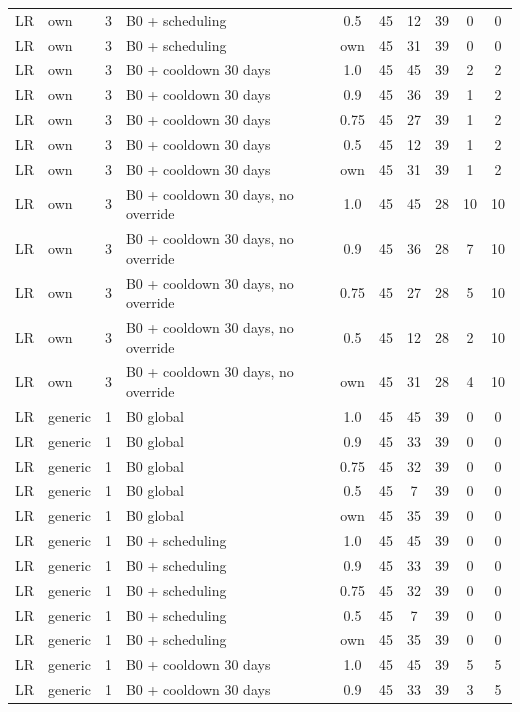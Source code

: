 \documentclass[10pt,onecolumn,letterpaper]{article}
\begin{document}
\begin{longtable}{lllp{4.4cm}cccccc}
LR & own & 3 & B0 + scheduling & 0.5 & 45 & 12 & 39 & 0 & 0 \\
LR & own & 3 & B0 + scheduling & own & 45 & 31 & 39 & 0 & 0 \\
LR & own & 3 & B0 + cooldown 30 days & 1.0 & 45 & 45 & 39 & 2 & 2 \\
LR & own & 3 & B0 + cooldown 30 days & 0.9 & 45 & 36 & 39 & 1 & 2 \\
LR & own & 3 & B0 + cooldown 30 days & 0.75 & 45 & 27 & 39 & 1 & 2 \\
LR & own & 3 & B0 + cooldown 30 days & 0.5 & 45 & 12 & 39 & 1 & 2 \\
LR & own & 3 & B0 + cooldown 30 days & own & 45 & 31 & 39 & 1 & 2 \\
LR & own & 3 & B0 + cooldown 30 days, no override & 1.0 & 45 & 45 & 28 & 10 & 10 \\
LR & own & 3 & B0 + cooldown 30 days, no override & 0.9 & 45 & 36 & 28 & 7 & 10 \\
LR & own & 3 & B0 + cooldown 30 days, no override & 0.75 & 45 & 27 & 28 & 5 & 10 \\
LR & own & 3 & B0 + cooldown 30 days, no override & 0.5 & 45 & 12 & 28 & 2 & 10 \\
LR & own & 3 & B0 + cooldown 30 days, no override & own & 45 & 31 & 28 & 4 & 10 \\
LR & generic & 1 & B0 global & 1.0 & 45 & 45 & 39 & 0 & 0 \\
LR & generic & 1 & B0 global & 0.9 & 45 & 33 & 39 & 0 & 0 \\
LR & generic & 1 & B0 global & 0.75 & 45 & 32 & 39 & 0 & 0 \\
LR & generic & 1 & B0 global & 0.5 & 45 & 7 & 39 & 0 & 0 \\
LR & generic & 1 & B0 global & own & 45 & 35 & 39 & 0 & 0 \\
LR & generic & 1 & B0 + scheduling & 1.0 & 45 & 45 & 39 & 0 & 0 \\
LR & generic & 1 & B0 + scheduling & 0.9 & 45 & 33 & 39 & 0 & 0 \\
LR & generic & 1 & B0 + scheduling & 0.75 & 45 & 32 & 39 & 0 & 0 \\
LR & generic & 1 & B0 + scheduling & 0.5 & 45 & 7 & 39 & 0 & 0 \\
LR & generic & 1 & B0 + scheduling & own & 45 & 35 & 39 & 0 & 0 \\
LR & generic & 1 & B0 + cooldown 30 days & 1.0 & 45 & 45 & 39 & 5 & 5 \\
LR & generic & 1 & B0 + cooldown 30 days & 0.9 & 45 & 33 & 39 & 3 & 5 \\

\end{longtable}
\end{document}
